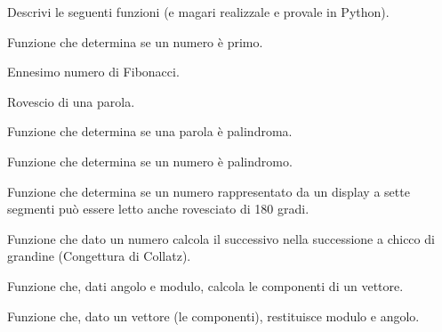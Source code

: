 \begin{esercizio}\label{ese:03.1}
Descrivi le seguenti funzioni (e magari realizzale e provale in Python).
 \begin{enumeratea}
\item Funzione che determina se un numero è primo.
\item Ennesimo numero di Fibonacci.
\item Rovescio di una parola.
\item Funzione che determina se una parola è palindroma.
\item Funzione che determina se un numero è palindromo.
\item Funzione che determina se un numero rappresentato da un display a 
sette segmenti può essere letto anche rovesciato di 180 gradi.
\item Funzione che dato un numero calcola il successivo nella successione a 
chicco di grandine (Congettura di Collatz).
\item Funzione che, dati angolo e modulo, calcola le componenti di un 
vettore.
\item Funzione che, dato un vettore (le componenti), restituisce modulo e 
angolo.
 \end{enumeratea}
\end{esercizio}


